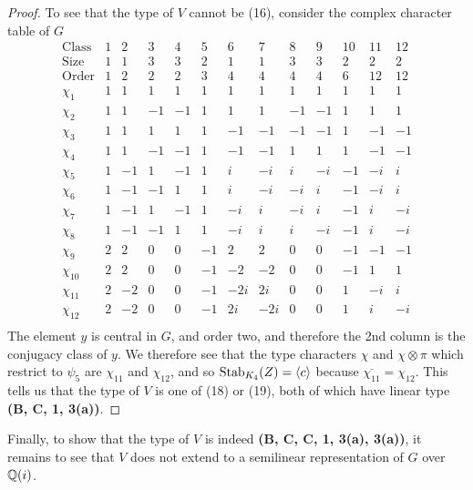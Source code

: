 \begin{proof}
To see that the type of $V$ cannot be (16), consider the complex character table of $G$
\[
\begin{array}{c|rrrrrrrrrrrr}
\text{Class} & 1 & 2 & 3 & 4 & 5 & 6 & 7 & 8 & 9 & 10 & 11 & 12 \\
\hline
\text{Size}  & 1 & 1 & 3 & 3 & 2 & 1 & 1 & 3 & 3 & 2 & 2 & 2 \\
\text{Order} & 1 & 2 & 2 & 2 & 3 & 4 & 4 & 4 & 4 & 6 & 12 & 12 \\
\hline
\chi_1  & 1 & 1 & 1 & 1 & 1 & 1 & 1 & 1 & 1 & 1 & 1 & 1 \\
\chi_2  & 1 & 1 & -1 & -1 & 1 & 1 & 1 & -1 & -1 & 1 & 1 & 1 \\
\chi_3  & 1 & 1 & 1 & 1 & 1 & -1 & -1 & -1 & -1 & 1 & -1 & -1 \\
\chi_4  & 1 & 1 & -1 & -1 & 1 & -1 & -1 & 1 & 1 & 1 & -1 & -1 \\
\chi_5  & 1 & -1 & 1 & -1 & 1 & i & -i & i & -i & -1 & -i & i \\
\chi_6  & 1 & -1 & -1 & 1 & 1 & i & -i & -i & i & -1 & -i & i \\
\chi_7  & 1 & -1 & 1 & -1 & 1 & -i & i & -i & i & -1 & i & -i \\
\chi_8  & 1 & -1 & -1 & 1 & 1 & -i & i & i & -i & -1 & i & -i \\
\chi_9  & 2 & 2 & 0 & 0 & -1 & 2 & 2 & 0 & 0 & -1 & -1 & -1 \\
\chi_{10} & 2 & 2 & 0 & 0 & -1 & -2 & -2 & 0 & 0 & -1 & 1 & 1 \\
\chi_{11} & 2 & -2 & 0 & 0 & -1 & -2i & 2i & 0 & 0 & 1 & -i & i \\
\chi_{12} & 2 & -2 & 0 & 0 & -1 & 2i & -2i & 0 & 0 & 1 & i & -i \\
\end{array}
\]
The element $y$ is central in $G$, and order two, and therefore the 2nd column is the conjugacy class of $y$. We therefore see that the type characters $\chi$ and $\chi \otimes \pi$ which restrict to $\psi_5$ are $\chi_{11}$ and $\chi_{12}$, and so $\operatorname{Stab}_{K_4}(Z) = \langle c \rangle$ because $\overline{\chi_{11}} = \chi_{12}$. This tells us that the type of $V$ is one of (18) or (19), both of which have linear type \textbf{(B, C, 1, 3(a))}.
\end{proof}

Finally, to show that the type of $V$ is indeed \textbf{(B, C, C, 1, 3(a), 3(a))}, it remains to see that $V$ does not extend to a semilinear representation of $G$ over ${\mathbb Q}(i)$.

